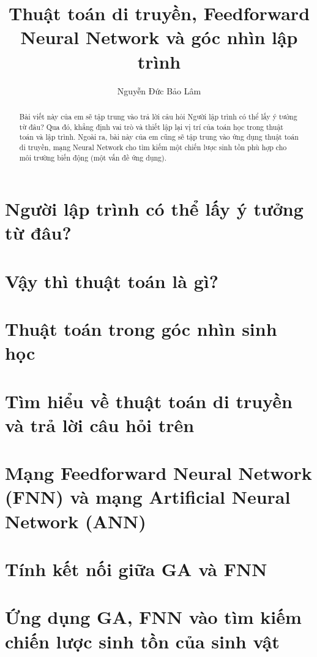\documentclass[12pt]{article}
\title{Thuật toán di truyền, Feedforward Neural Network và góc nhìn lập trình}
\author{Nguyễn Đức Bảo Lâm}
\begin{document}
\maketitle 

\tableofcontents
\pagebreak

\begin{abstract}
	Bài viết này của em sẽ tập trung vào trả lời câu hỏi \hypertarget{main_question}{Người lập trình có thể lấy ý tưởng từ đâu?} Qua đó, khẳng định vai trò và thiết lập lại vị trí của toán học trong thuật toán và lập trình. Ngoài ra, bài này của em cũng sẽ tập trung vào ứng dụng thuật toán di truyền, mạng Neural Network cho tìm kiếm một chiến lược sinh tồn phù hợp cho môi trường biến động (một vấn đề ứng dụng).
\end{abstract}

\section{Người lập trình có thể lấy ý tưởng từ đâu?}


\section{Vậy thì thuật toán là gì?}
\label{sec:algorithm}


\section{Thuật toán trong góc nhìn sinh học}


\section{Tìm hiểu về thuật toán di truyền và trả lời câu hỏi trên}


\section{Mạng Feedforward Neural Network (FNN) và mạng Artificial Neural Network (ANN)}


\section{Tính kết nối giữa GA và FNN}


\section{Ứng dụng GA, FNN vào tìm kiếm chiến lược sinh tồn của sinh vật}

 	
\end{document}
